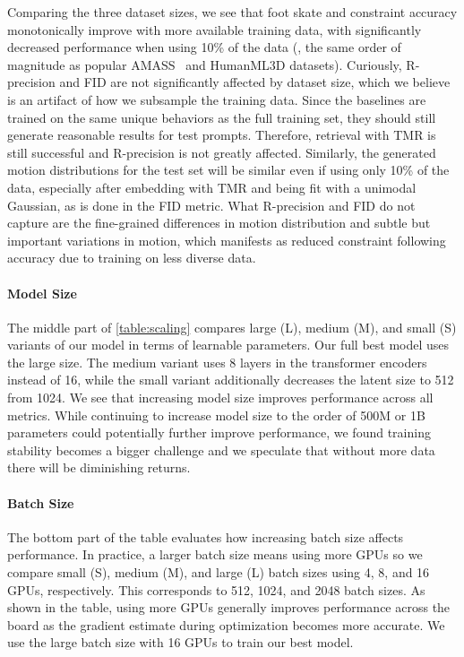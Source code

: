 Comparing the three dataset sizes, we see that foot skate and constraint accuracy monotonically improve with more available training data, with significantly decreased performance when using 10\% of the data (\ie, the same order of magnitude as popular AMASS~\cite{mahmood2019amass} and HumanML3D datasets). 
Curiously, R-precision and FID are not significantly affected by dataset size, which we believe is an artifact of how we subsample the training data. Since the baselines are trained on the same unique behaviors as the full training set, they should still generate reasonable results for test prompts. Therefore, retrieval with TMR is still successful and R-precision is not greatly affected. 
Similarly, the generated motion distributions for the test set will be similar even if using only 10\% of the data, especially after embedding with TMR and being fit with a unimodal Gaussian, as is done in the FID metric. 
What R-precision and FID do not capture are the fine-grained differences in motion distribution and subtle but important variations in motion, which manifests as reduced constraint following accuracy due to training on less diverse data.

\paragraph{Model Size}
The middle part of \cref{table:scaling} compares large (L), medium (M), and small (S) variants of our model in terms of learnable parameters. Our full best model uses the large size. The medium variant uses 8 layers in the transformer encoders instead of 16, while the small variant additionally decreases the latent size to 512 from 1024. We see that increasing model size improves performance across all metrics. While continuing to increase model size to the order of 500M or 1B parameters could potentially further improve performance, we found training stability becomes a bigger challenge and we speculate that without more data there will be diminishing returns.


\paragraph{Batch Size}
The bottom part of the table evaluates how increasing batch size affects performance. In practice, a larger batch size means using more GPUs so we compare small (S), medium (M), and large (L) batch sizes using 4, 8, and 16 GPUs, respectively. This corresponds to 512, 1024, and 2048 batch sizes.
As shown in the table, using more GPUs generally improves performance across the board as the gradient estimate during optimization becomes more accurate. 
We use the large batch size with 16 GPUs to train our best model.


